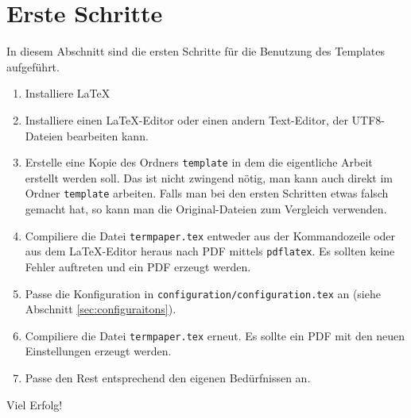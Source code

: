%
\section{Erste Schritte}
In diesem Abschnitt sind die ersten Schritte für die Benutzung des Templates aufgeführt.
\begin{enumerate}
\item Installiere \LaTeX
\item Installiere einen \LaTeX-Editor oder einen andern Text-Editor, der UTF8-Dateien bearbeiten kann.
\item Erstelle eine Kopie des Ordners \texttt{template} in dem die eigentliche Arbeit erstellt werden soll. Das ist nicht zwingend nötig, man kann auch direkt im Ordner \texttt{template} arbeiten. Falls man bei den ersten Schritten etwas falsch gemacht hat, so kann man die Original-Dateien zum Vergleich verwenden.
\item Compiliere die Datei \texttt{termpaper.tex} entweder aus der Kommandozeile oder aus dem \LaTeX-Editor heraus nach PDF mittels \texttt{pdflatex}. Es sollten keine Fehler auftreten und ein PDF erzeugt werden.
\item Passe die Konfiguration in \texttt{configuration/configuration.tex} an (siehe Abschnitt \ref{sec:configuraitons}).
\item Compiliere die Datei \texttt{termpaper.tex} erneut. Es sollte ein PDF mit den neuen Einstellungen erzeugt werden.
\item Passe den Rest entsprechend den eigenen Bedürfnissen an.
\end{enumerate}

Viel Erfolg!
